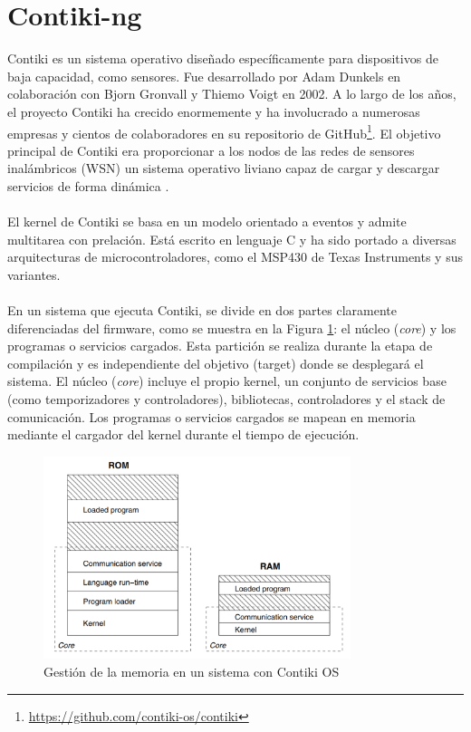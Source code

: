 \section{Contiki-ng}
\label{sec:contikiNG}

Contiki es un sistema operativo diseñado específicamente para dispositivos de baja capacidad, como sensores. Fue desarrollado por Adam Dunkels en colaboración con Bjorn Gronvall y Thiemo Voigt en 2002. A lo largo de los años, el proyecto Contiki ha crecido enormemente y ha involucrado a numerosas empresas y cientos de colaboradores en su repositorio de GitHub\footnote{\url{https://github.com/contiki-os/contiki}}. El objetivo principal de Contiki era proporcionar a los nodos de las redes de sensores inalámbricos (WSN) un sistema operativo liviano capaz de cargar y descargar servicios de forma dinámica \cite{1367266}.\\
\\
El kernel de Contiki se basa en un modelo orientado a eventos y admite multitarea con prelación. Está escrito en lenguaje C y ha sido portado a diversas arquitecturas de microcontroladores, como el MSP430 de Texas Instruments y sus variantes.\\
\\
En un sistema que ejecuta Contiki, se divide en dos partes claramente diferenciadas del firmware, como se muestra en la Figura \ref{fig:contikiParts}: el núcleo (\textit{core}) y los programas o servicios cargados. Esta partición se realiza durante la etapa de compilación y es independiente del objetivo (target) donde se desplegará el sistema. El núcleo (\textit{core}) incluye el propio kernel, un conjunto de servicios base (como temporizadores y controladores), bibliotecas, controladores y el stack de comunicación. Los programas o servicios cargados se mapean en memoria mediante el cargador del kernel durante el tiempo de ejecución.\\


\begin{figure}[ht]
    \centering
    \includegraphics[width=0.8\textwidth]{archivos/img/teoria/contiki.png}
    \caption{Gestión de la memoria en un sistema con Contiki OS \cite{1367266}}
    \label{fig:contikiParts}
\end{figure}


